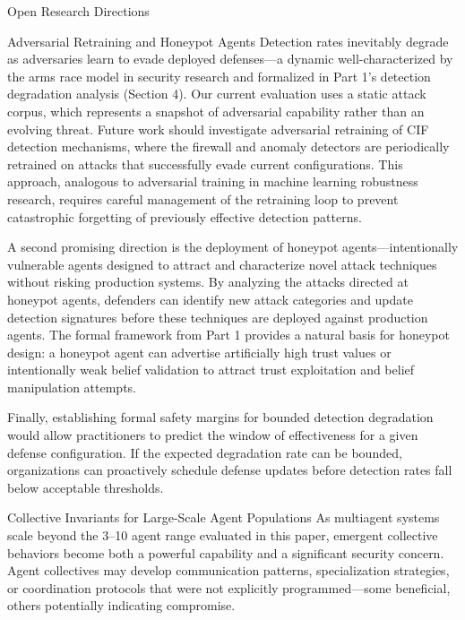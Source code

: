 \documentclass[
  ignorenonframetext,
]{beamer}
\begin{document}
\begin{frame}{Open Research Directions}
\protect{}\label{open-research-directions}
\begin{block}{Adversarial Retraining and Honeypot Agents}
\protect{}\label{adversarial-retraining-and-honeypot-agents}
Detection rates inevitably degrade as adversaries learn to evade
deployed defenses---a dynamic well-characterized by the arms race model
in security research and formalized in Part 1's detection degradation
analysis (Section 4). Our current evaluation uses a static attack
corpus, which represents a snapshot of adversarial capability rather
than an evolving threat. Future work should investigate adversarial
retraining of CIF detection mechanisms, where the firewall and anomaly
detectors are periodically retrained on attacks that successfully evade
current configurations. This approach, analogous to adversarial training
in machine learning robustness research, requires careful management of
the retraining loop to prevent catastrophic forgetting of previously
effective detection patterns.

A second promising direction is the deployment of honeypot
agents---intentionally vulnerable agents designed to attract and
characterize novel attack techniques without risking production systems.
By analyzing the attacks directed at honeypot agents, defenders can
identify new attack categories and update detection signatures before
these techniques are deployed against production agents. The formal
framework from Part 1 provides a natural basis for honeypot design: a
honeypot agent can advertise artificially high trust values or
intentionally weak belief validation to attract trust exploitation and
belief manipulation attempts.

Finally, establishing formal safety margins for bounded detection
degradation would allow practitioners to predict the window of
effectiveness for a given defense configuration. If the expected
degradation rate can be bounded, organizations can proactively schedule
defense updates before detection rates fall below acceptable thresholds.
\end{block}

\begin{block}{Collective Invariants for Large-Scale Agent Populations}
\protect{}\label{collective-invariants-for-large-scale-agent-populations}
As multiagent systems scale beyond the 3--10 agent range evaluated in
this paper, emergent collective behaviors become both a powerful
capability and a significant security concern. Agent collectives may
develop communication patterns, specialization strategies, or
coordination protocols that were not explicitly programmed---some
beneficial, others potentially indicating compromise.


\end{block}
\end{frame}
\end{document}
